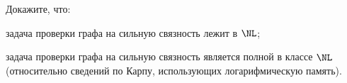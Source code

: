 Докажите, что:
\begin{enumcyr}
    \item задача проверки графа на сильную связность лежит в $\NL$;
    \item задача проверки графа на сильную связность является полной в классе $\NL$ (относительно
        сведений по Карпу, использующих логарифмическую память).
\end{enumcyr}